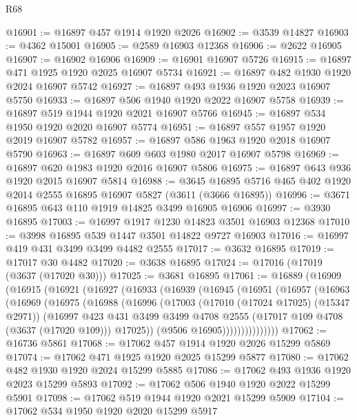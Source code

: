 \begin{lexlean}{R68}
\begin{coremodule}
@16901 := @16897 @457 @1914 @1920 @2026
@16902 := @3539 @14827
@16903 := @4362 @15001
@16905 := @2589 @16903 @12368
@16906 := @2622 @16905
@16907 := @16902 @16906
@16909 := @16901 @16907 @5726
@16915 := @16897 @471 @1925 @1920 @2025 @16907 @5734
@16921 := @16897 @482 @1930 @1920 @2024 @16907 @5742
@16927 := @16897 @493 @1936 @1920 @2023 @16907 @5750
@16933 := @16897 @506 @1940 @1920 @2022 @16907 @5758
@16939 := @16897 @519 @1944 @1920 @2021 @16907 @5766
@16945 := @16897 @534 @1950 @1920 @2020 @16907 @5774
@16951 := @16897 @557 @1957 @1920 @2019 @16907 @5782
@16957 := @16897 @586 @1963 @1920 @2018 @16907 @5790
@16963 := @16897 @609 @603 @1980 @2017 @16907 @5798
@16969 := @16897 @620 @1983 @1920 @2016 @16907 @5806
@16975 := @16897 @643 @936 @1920 @2015 @16907 @5814
@16988 := @3645 @16895 @5716 @465 @402 @1920 @2014 @2555 @16895 @16907 @5827 (@3611 (@3666 @16895))
@16996 := @3671 @16895 @643 @110 @1919 @14825 @3499 @16905 @16906
@16997 := @3930 @16895
@17003 := @16997 @1917 @1230 @14823 @3501 @16903 @12368
@17010 := @3998 @16895 @539 @1447 @3501 @14822 @9727 @16903
@17016 := @16997 @419 @431 @3499 @3499 @4482 @2555
@17017 := @3632 @16895
@17019 := @17017 @30 @4482
@17020 := @3638 @16895
@17024 := @17016 (@17019 (@3637 (@17020 @30)))
@17025 := @3681 @16895
@17061 := @16889
    (@16909
      (@16915
        (@16921
          (@16927
            (@16933
              (@16939
                (@16945
                  (@16951
                    (@16957
                      (@16963
                        (@16969
                          (@16975
                            (@16988
                              (@16996
                                (@17003
                                  (@17010 (@17024 @17025) (@15347 @2971))
                                  (@16997
                                    @423
                                    @431
                                    @3499
                                    @3499
                                    @4708
                                    @2555
                                    (@17017 @109 @4708 (@3637 (@17020 @109)))
                                    @17025))
                                (@9506 @16905)))))))))))))))
@17062 := @16736 @5861
@17068 := @17062 @457 @1914 @1920 @2026 @15299 @5869
@17074 := @17062 @471 @1925 @1920 @2025 @15299 @5877
@17080 := @17062 @482 @1930 @1920 @2024 @15299 @5885
@17086 := @17062 @493 @1936 @1920 @2023 @15299 @5893
@17092 := @17062 @506 @1940 @1920 @2022 @15299 @5901
@17098 := @17062 @519 @1944 @1920 @2021 @15299 @5909
@17104 := @17062 @534 @1950 @1920 @2020 @15299 @5917

\end{coremodule}
\end{lexlean}
